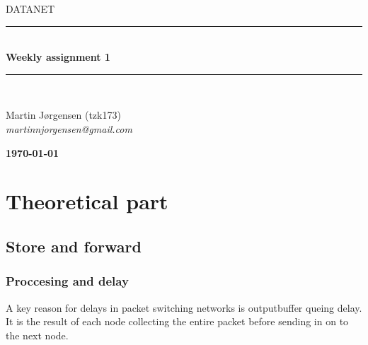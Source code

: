 \documentclass[10pt]{article}
\newcommand{\HRule}{\rule{\linewidth}{0.5mm}}
\begin{document}
\begin{titlepage}

\begin{center}

\textsc{\LARGE DATANET}\\[1.5cm]


\HRule \\[0.4cm]

{ \bfseries Weekly assignment 1}\\[1cm]

\HRule \\ [7.5cm]

\begin{minipage}{0.5\textwidth}
\begin{flushleft} \large
Martin Jørgensen (tzk173)\\
\textit{martinnjorgensen@gmail.com}\\
\end{flushleft}
\end{minipage}
\begin{minipage}{0.4\textwidth}
\begin{flushright} \large
\textbf{\today} \\
\end{flushright}
\end{minipage}

\vfill 



\end{center}

\end{titlepage}
\clearpage

\section{Theoretical part}
\subsection{Store and forward}
\subsubsection{Proccesing and delay}
A key reason for delays in packet switching networks is outputbuffer queing
delay. It is the result of each node collecting the entire packet before sending
in on to the next node.
\end{document}
